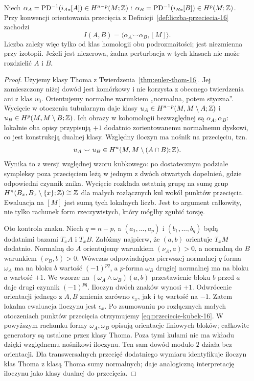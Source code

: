 \begin{twierdzenie}
\label{thm:przeciecie-kubek-16}
Niech $\alpha_A=\operatorname{PD}^{-1}
(i_{A*}[A])\in H^{n-p}(M;\mathbb{Z})$
i $\alpha_B=\operatorname{PD}^{-1}
(i_{B*}[B])\in H^p(M;\mathbb{Z})$.
Przy konwencji orientowania przecięcia
z Definicji~\ref{def:liczba-przeciecia-16}
zachodzi
\begin{equation}\label{eq:przeciecie-kubek-16}
 I(A,B)=
 \langle\alpha_A\smile\alpha_B,[M]\rangle.
\end{equation}
Liczba zależy więc tylko od klas
homologii obu podrozmaitości;
jest niezmienna przy izotopii.
Jeżeli jest niezerowa, żadna
perturbacja w tych klasach nie
może rozdzielić $A$ i $B$.
\end{twierdzenie}
\begin{proof}
Użyjemy klasy Thoma z Twierdzenia~\ref{thm:euler-thom-16}.
Jej zamieszczony niżej dowód jest komórkowy i nie
korzysta z obecnego twierdzenia ani z klas $w_i$.
Orientujemy normalne warunkiem „normalna, potem styczna”.
Wycięcie w otoczeniu tubularnym daje klasy
$u_A\in H^{n-p}(M,M\setminus A;\mathbb{Z})$ i
$u_B\in H^p(M,M\setminus B;\mathbb{Z})$.
Ich obrazy w kohomologii bezwzględnej są $\alpha_A,\alpha_B$:
lokalnie oba opisy przypisują $+1$ dodatnio zorientowanemu
normalnemu dyskowi, co jest konstrukcją dualnej klasy.
Względny iloczyn ma nośnik na przecięciu, tzn.
\[
 u_A\smile u_B\in H^n(M,M\setminus(A\cap B);\mathbb{Z}).
\]
Wynika to z wersji względnej wzoru kubkowego:
po dostatecznym podziale sympleksy poza przecięciem
leżą w jednym z dwóch otwartych dopełnień,
gdzie odpowiedni czynnik znika.
Wycięcie rozkłada ostatnią grupę na sumę grup
$H^n(B_x,B_x\setminus\{x\};\mathbb{Z})\cong\mathbb{Z}$
dla małych rozłącznych kul wokół punktów przecięcia.
Ewaluacja na $[M]$ jest sumą tych lokalnych liczb.
Jest to argument całkowity, nie tylko rachunek form
rzeczywistych, który mógłby zgubić torsję.

Oto kontrola znaku.
Niech $q=n-p$, a
$(a_1,\ldots,a_p)$
i $(b_1,\ldots,b_q)$
będą dodatnimi
bazami $T_xA$ i $T_xB$.
Załóżmy najpierw,
że $(a,b)$ orientuje
$T_xM$ dodatnio.
Normalną do $A$
orientujemy warunkiem
$(\nu_A,a)>0$,
a normalną do $B$
warunkiem
$(\nu_B,b)>0$.
Wówczas odpowiadająca
pierwszej normalnej
$q$-forma $\omega_A$
ma na bloku $b$
wartość $(-1)^{pq}$,
a $p$-forma $\omega_B$
drugiej normalnej
ma na bloku $a$
wartość $+1$.
We wzorze na
$(\omega_A\wedge\omega_B)(a,b)$
przestawienie bloku
$b$ przed $a$
daje drugi czynnik
$(-1)^{pq}$.
Iloczyn dwóch znaków
wynosi $+1$.
Odwrócenie orientacji
jednego z $A,B$
zmienia zarówno
$\epsilon_x$, jak
i tę wartość na $-1$.
Zatem lokalna ewaluacja
iloczynu jest $\epsilon_x$.
Po zsumowaniu po rozłącznych
małych otoczeniach punktów
przecięcia otrzymujemy
\eqref{eq:przeciecie-kubek-16}.
W powyższym rachunku formy $\omega_A,\omega_B$
opisują orientacje liniowych bloków; całkowite
generatory są ustalone przez klasy Thoma.
Poza tymi kulami nie ma wkładu dzięki względnemu
nośnikowi iloczynu. Ten sam dowód modulo $2$
działa bez orientacji. Dla transwersalnych przecięć
dodatniego wymiaru identyfikuje iloczyn klas Thoma
z klasą Thoma sumy normalnych; daje analogiczną
interpretację iloczynu jako klasy dualnej do przecięcia.


\end{proof}
